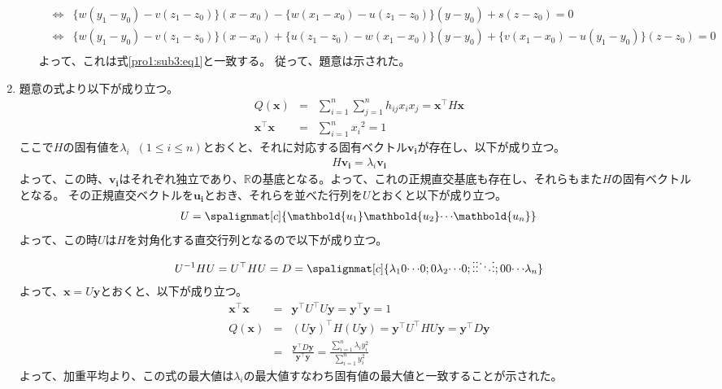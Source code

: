 \documentclass[dvipdfmx,titlepage, 11pt, a4paper]{jsarticle}%
\begin{document}
\begin{enumerate}[(1)]
\begin{enumerate}[(a)]
\begin{eqnarray*}
      &\Longleftrightarrow&
      \{w(y_1 - y_0) - v(z_1 - z_0)\}(x - x_0) - \{w(x_1 - x_0) - u(z_1 - z_0)\}(y - y_0) + s(z - z_0) = 0\\
      &\Longleftrightarrow&
      \{w(y_1 - y_0) - v(z_1 - z_0)\}(x - x_0) + \{u(z_1 - z_0) - w(x_1 - x_0)\}(y - y_0) + \{v(x_1 - x_0) - u(y_1 - y_0)\}(z - z_0) = 0\\
    \end{eqnarray*}
    よって、これは式\eqref{pro1:sub3:eq1}と一致する。
    従って、題意は示された。
  \end{enumerate}
  \item 題意の式より以下が成り立つ。
  \begin{eqnarray*}
    Q(\mathbold{x}) &=& \sum_{i = 1}^{n}\sum_{j = 1}^{n}h_{ij}x_{i}x_{j}
    = \mathbold{x}^{\top}H\mathbold{x}\\
    \mathbold{x}^{\top}\mathbold{x} &=& \sum_{i = 1}^{n}x_{i}{}^2 = 1
  \end{eqnarray*}
  ここで$H$の固有値を$\lambda_{i}\;\;(1 \leq i \leq n)$とおくと、それに対応する固有ベクトル$\mathbold{v_i}$が存在し、以下が成り立つ。
  \begin{eqnarray*}
    H\mathbold{v_i} = \lambda_{i}\mathbold{v_i}
  \end{eqnarray*}
  よって、この時、$\mathbold{v_i}$はそれぞれ独立であり、$\mathbb{R}$の基底となる。よって、これの正規直交基底も存在し、それらもまた$H$の固有ベクトルとなる。
  その正規直交ベクトルを$\mathbold{u_i}$とおき、それらを並べた行列を$U$とおくと以下が成り立つ。
  \begin{eqnarray*}
    U = \spalignmat[c]{
      {\mathbold{u_1}} {\mathbold{u_2}} {\cdots} {\mathbold{u_n}}
    }
  \end{eqnarray*}
  よって、この時$U$は$H$を対角化する直交行列となるので以下が成り立つ。
  \begin{eqnarray*}
    U^{-1}HU = U^{\top}HU = D = \spalignmat[c]{
      {\lambda_1} {0} {\cdots} {0};
      {0} {\lambda_2} {\cdots} {0};
      {\vdots} {\vdots} {\ddots} {\vdots};
      {0} {0} {\cdots} {\lambda_n}
    }
  \end{eqnarray*}
  よって、$\mathbold{x} = U\mathbold{y}$とおくと、以下が成り立つ。
  \begin{eqnarray*}
    \mathbold{x}^{\top}\mathbold{x} &=& \mathbold{y}^{\top}U^{\top}U\mathbold{y} = \mathbold{y}^{\top}\mathbold{y} = 1\\
    Q(\mathbold{x}) &=& \left(U\mathbold{y}\right)^{\top}H\left(U\mathbold{y}\right) = \mathbold{y}^{\top}U^{\top}HU\mathbold{y} 
    = \mathbold{y}^{\top}D\mathbold{y}\\
    &=& \frac{\mathbold{y}^{\top}D\mathbold{y}}{\mathbold{y}^{\top}\mathbold{y}} = \frac{\sum_{i = 1}^{n}\lambda_{i}y_{i}^2}{\sum_{i = 1}^{n}y_{i}^2}
  \end{eqnarray*}
  よって、加重平均より、この式の最大値は$\lambda_{i}$の最大値すなわち固有値の最大値と一致することが示された。
\end{enumerate}
\newpage
\end{document}
